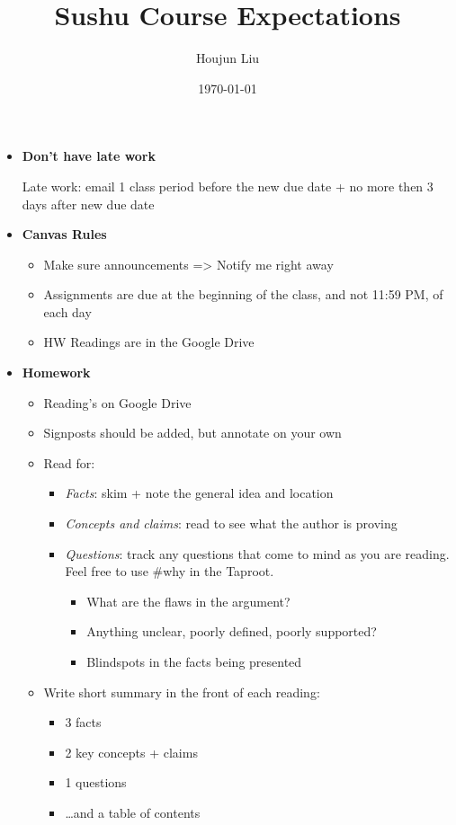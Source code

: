 \documentclass[letterpaper]{article}
\author{Houjun Liu}
\date{\today}
\title{Sushu Course Expectations}
\renewcommand{\tableofcontents}{}
\begin{document}
\tableofcontents

\begin{itemize}
\item \textbf{Don't have late work}

Late work: email 1 class period before the new due date + no more then
3 days after new due date

\item \textbf{Canvas Rules}

\begin{itemize}
\item Make sure announcements => Notify me right away
\item Assignments are due at the beginning of the class, and not 11:59 PM,
of each day
\item HW Readings are in the Google Drive
\end{itemize}

\item \textbf{Homework}

\begin{itemize}
\item Reading's on Google Drive
\item Signposts should be added, but annotate on your own
\item Read for:

\begin{itemize}
\item \emph{Facts}: skim + note the general idea and location
\item \emph{Concepts and claims}: read to see what the author is proving
\item \emph{Questions}: track any questions that come to mind as you are
reading. Feel free to use \#why in the Taproot.

\begin{itemize}
\item What are the flaws in the argument?
\item Anything unclear, poorly defined, poorly supported?
\item Blindspots in the facts being presented
\end{itemize}
\end{itemize}

\item Write short summary in the front of each reading:

\begin{itemize}
\item 3 facts
\item 2 key concepts + claims
\item 1 questions
\item \ldots{}and a table of contents
\end{itemize}


\end{itemize}
\end{itemize}
\end{document}
